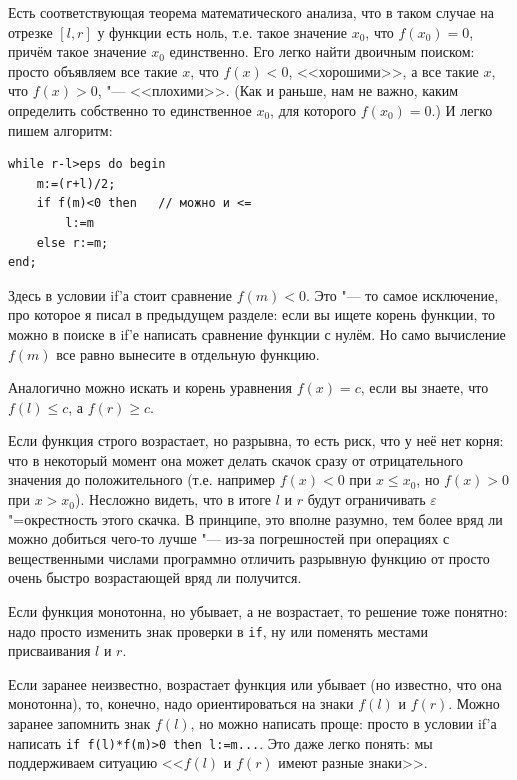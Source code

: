 \documentclass[a4paper,10pt]{problems}
\let\eps\varepsilon
\begin{document}
Есть соответствующая теорема математического анализа, что в таком случае на отрезке $[l,r]$ у функции есть ноль,
т.е. такое значение $x_0$, что $f(x_0)=0$, причём такое значение $x_0$ единственно. 
Его легко найти двоичным поиском: просто объявляем все такие $x$, что $f(x)<0$, <<хорошими>>,
а все такие $x$, что $f(x)>0$, "--- <<плохими>>. 
(Как и раньше, нам не важно, каким определить собственно то единственное $x_0$, для которого $f(x_0)=0$.)
И легко пишем алгоритм:
\begin{codesampleo}\begin{verbatim}
while r-l>eps do begin    
    m:=(r+l)/2;
    if f(m)<0 then   // можно и <=
        l:=m
    else r:=m;
end;
\end{verbatim}
\end{codesampleo}

Здесь в условии if'а стоит сравнение $f(m)<0$. 
Это "--- то самое исключение, про которое я писал в предыдущем разделе: если вы ищете корень функции, то можно в поиске в if'е написать
сравнение функции с нулём. Но само вычисление $f(m)$ все равно вынесите в отдельную функцию.

Аналогично можно искать и корень уравнения $f(x)=c$, если вы знаете, что $f(l)\leq c$, а $f(r)\geq c$.

Если функция строго возрастает, но разрывна, то есть риск, что у неё нет корня: что в некоторый момент она может делать скачок сразу от отрицательного
значения до положительного (т.е. например $f(x)<0$ при $x\leq x_0$, но $f(x)>0$ при $x>x_0$). 
Несложно видеть, что в итоге $l$ и $r$ будут ограничивать $\eps$"=окрестность этого скачка. 
В принципе, это вполне разумно, тем более вряд ли можно добиться чего-то лучше
"--- из-за погрешностей при операциях с вещественными числами программно отличить разрывную функцию от просто очень быстро возрастающей
вряд ли получится.

Если функция монотонна, но убывает, а не возрастает, то решение тоже понятно: надо просто изменить знак проверки в \verb`if`, ну или
поменять местами присваивания $l$ и $r$. 

Если заранее неизвестно, возрастает функция или убывает (но известно, что она монотонна), то, конечно, надо ориентироваться на знаки $f(l)$ и $f(r)$.
Можно заранее запомнить знак $f(l)$, но можно написать проще: просто в условии if'а написать \verb`if f(l)*f(m)>0 then l:=m...`.
Это даже легко понять: мы поддерживаем ситуацию <<$f(l)$ и $f(r)$ имеют разные знаки>>.
\end{document}
